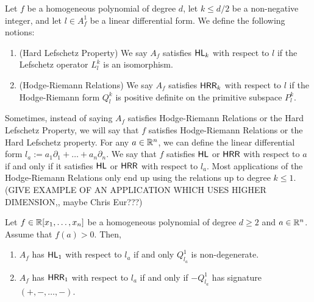 \documentclass{puthesis-UG}
\begin{document}
\begin{defn}
	Let $f$ be a homogeneous polynomial of degree $d$, let $k \leq d/2$ be a non-negative integer, and let $l \in A_f^1$ be a linear differential form. We define the following notions:
	\begin{enumerate}[label = (\alph*)]
		\item (Hard Lefschetz Property) We say $A_f$ satisfies $\mathsf{HL}_k$ with respect to $l$ if the Lefschetz operator $L_l^k$ is an isomorphism.

		\item (Hodge-Riemann Relations) We say $A_f$ satisfies $\mathsf{HRR}_k$ with respect to $l$ if the Hodge-Riemann form $Q_l^k$ is positive definite on the primitive subspace $P_l^k$. 
	\end{enumerate}
\end{defn}

Sometimes, instead of saying $A_f$ satisfies Hodge-Riemann Relations or the Hard Lefschetz Property, we will say that $f$ satisfies Hodge-Riemann Relations or the Hard Lefschetz property. For any $a \in \mathbb{R}^n$, we can define the linear differential form $l_a := a_1 \partial_1 + \ldots + a_n \partial_n$. We say that $f$ satisfies $\mathsf{HL}$ or $\mathsf{HRR}$ with respect to $a$ if and only if it satisfies $\mathsf{HL}$ or $\mathsf{HRR}$ with respect to $l_a$. Most applications of the Hodge-Riemann Relations only end up using the relations up to degree $k \leq 1$. (GIVE EXAMPLE OF AN APPLICATION WHICH USES HIGHER DIMENSION,, maybe Chris Eur???) 

\begin{prop}  \label{conditions-for-HL-HRR}
	Let $f \in \mathbb{R}[x_1, \ldots, x_n]$ be a homogeneous polynomial of degree $d \geq 2$ and $a \in \mathbb{R}^n$. Assume that $f(a) > 0$. Then, 
	\begin{enumerate}[label = (\alph*)]
		\item $A_f$ has $\mathsf{HL}_1$ with respect to $l_a$ if and only $Q_{l_a}^1$ is non-degenerate. 

		\item $A_f$ has $\mathsf{HRR}_1$ with respect to $l_a$ if and only if $-Q_{l_a}^1$ has signature $(+, -, \ldots, -)$. 
	\end{enumerate}
\end{prop}
\end{document}
